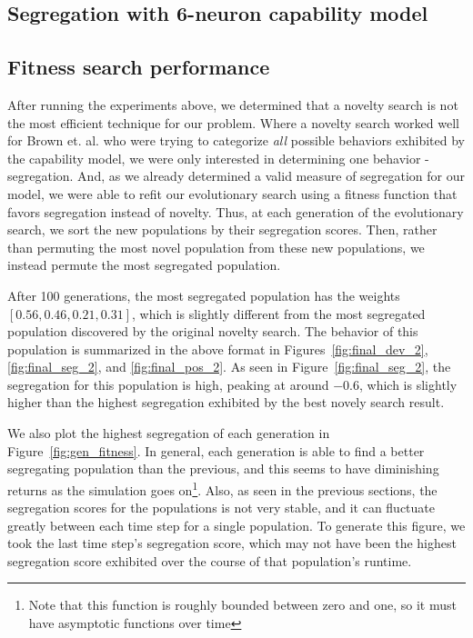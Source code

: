 \subsection{Segregation with 6-neuron capability model}
\label{sec:seg6}



\subsection{Fitness search performance}
\label{sec:fitness}

After running the experiments above, we determined that a novelty search is not the most efficient technique for our problem. 
Where a novelty search worked well for Brown et. al. who were trying to categorize \emph{all} possible behaviors exhibited by the capability model, we were only interested in determining one behavior - segregation.
And, as we already determined a valid measure of segregation for our model, we were able to refit our evolutionary search using a fitness function that favors segregation instead of novelty. 
Thus, at each generation of the evolutionary search, we sort the new populations by their segregation scores. 
Then, rather than permuting the most novel population from these new populations, we instead permute the most segregated population.

After 100 generations, the most segregated population has the weights $[0.56, 0.46, 0.21, 0.31]$, which is slightly different from the most segregated population discovered by the original novelty search. 
The behavior of this population is summarized in the above format in Figures~\ref{fig:final_dev_2}, \ref{fig:final_seg_2}, and \ref{fig:final_pos_2}. 
As seen in Figure~\ref{fig:final_seg_2}, the segregation for this population is high, peaking at around $-0.6$, which is slightly higher than the highest segregation exhibited by the best novely search result. 

We also plot the highest segregation of each generation in Figure~\ref{fig:gen_fitness}. 
In general, each generation is able to find a better segregating population than the previous, and this seems to have diminishing returns as the simulation goes on\footnote{Note that this function is roughly bounded between zero and one, so it must have asymptotic functions over time}. 
Also, as seen in the previous sections, the segregation scores for the populations is not very stable, and it can fluctuate greatly between each time step for a single population. 
To generate this figure, we took the last time step's segregation score, which may not have been the highest segregation score exhibited over the course of that population's runtime. 

